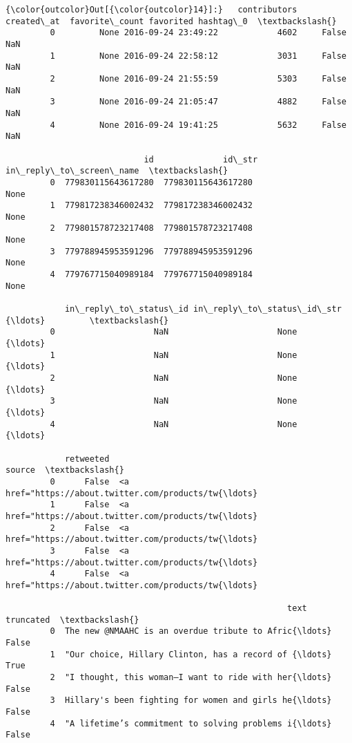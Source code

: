 \documentclass[11pt]{article}
\begin{document}
            \begin{Verbatim}[commandchars=\\\{\}]
{\color{outcolor}Out[{\color{outcolor}14}]:}   contributors          created\_at  favorite\_count favorited hashtag\_0  \textbackslash{}
         0         None 2016-09-24 23:49:22            4602     False       NaN   
         1         None 2016-09-24 22:58:12            3031     False       NaN   
         2         None 2016-09-24 21:55:59            5303     False       NaN   
         3         None 2016-09-24 21:05:47            4882     False       NaN   
         4         None 2016-09-24 19:41:25            5632     False       NaN   
         
                            id              id\_str in\_reply\_to\_screen\_name  \textbackslash{}
         0  779830115643617280  779830115643617280                    None   
         1  779817238346002432  779817238346002432                    None   
         2  779801578723217408  779801578723217408                    None   
         3  779788945953591296  779788945953591296                    None   
         4  779767715040989184  779767715040989184                    None   
         
            in\_reply\_to\_status\_id in\_reply\_to\_status\_id\_str        {\ldots}         \textbackslash{}
         0                    NaN                      None        {\ldots}          
         1                    NaN                      None        {\ldots}          
         2                    NaN                      None        {\ldots}          
         3                    NaN                      None        {\ldots}          
         4                    NaN                      None        {\ldots}          
         
            retweeted                                             source  \textbackslash{}
         0      False  <a href="https://about.twitter.com/products/tw{\ldots}   
         1      False  <a href="https://about.twitter.com/products/tw{\ldots}   
         2      False  <a href="https://about.twitter.com/products/tw{\ldots}   
         3      False  <a href="https://about.twitter.com/products/tw{\ldots}   
         4      False  <a href="https://about.twitter.com/products/tw{\ldots}   
         
                                                         text truncated  \textbackslash{}
         0  The new @NMAAHC is an overdue tribute to Afric{\ldots}     False   
         1  "Our choice, Hillary Clinton, has a record of {\ldots}      True   
         2  "I thought, this woman—I want to ride with her{\ldots}     False   
         3  Hillary's been fighting for women and girls he{\ldots}     False   
         4  "A lifetime’s commitment to solving problems i{\ldots}     False   
         

\end{Verbatim}
\end{document}
